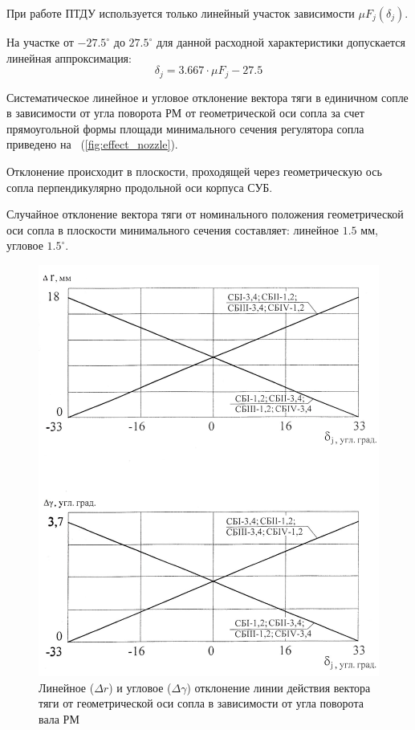 При работе ПТДУ используется только линейный участок зависимости $\mu F_j (\delta_j)$.

На участке от $-27.5^{\circ}$ до $27.5^{\circ}$ для данной расходной характеристики допускается линейная аппроксимация:
\begin{equation}
	\label{eq:ur_lin_approxim}
	\delta_j = 3.667 \cdot \mu F_j - 27.5
\end{equation}

Систематическое линейное и угловое отклонение вектора тяги в единичном сопле в зависимости от угла поворота РМ от геометрической оси сопла за счет прямоугольной формы площади минимального сечения регулятора сопла приведено на ~(\ref{fig:effect_nozzle}).

Отклонение происходит в плоскости, проходящей через геометрическую ось сопла перпендикулярно продольной оси корпуса СУБ.

Случайное отклонение вектора тяги от номинального положения геометрической оси сопла в плоскости минимального сечения составляет: линейное $1.5$ мм, угловое $1.5^{\circ}$.

\begin{figure}[h]
	\centering
	\includegraphics[scale=0.5]{images/linear_vect_draft.jpg}
	\caption{Линейное ($\Delta r$) и угловое ($\Delta \gamma$) отклонение линии действия вектора тяги от геометрической оси сопла в зависимости от угла поворота вала РМ}
	\label{fig:lin_angle_otklonenie}
\end{figure}

